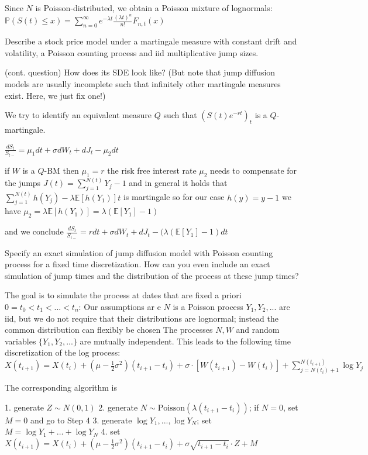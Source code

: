Since \(N\) is Poisson-distributed, we obtain a Poisson mixture of lognormals:
\( \mathbb{P} (S(t) \le x) = \sum_{n=0}^\infty e^{-\lambda t} \frac{(\lambda t)^n}{n!} F_{n,t}(x) \)


Describe a stock price model under a martingale measure with constant drift and
volatility, a Poisson counting process and iid multiplicative jump sizes. 

(cont. question) How does its SDE look like? (But note that jump diffusion models are usually incomplete
such that infinitely other martingale measures exist. Here, we just fix one!)

We try to identify an equivalent measure \( Q \) such that \((S(t)e^{−rt})_t \) is a \( Q \)-martingale.

\( \frac{dS_t}{S_{t-}} = \mu_1 dt + \sigma dW_t + dJ_t - \mu_2 dt \)

if \( W \) is a \( Q \)-BM then
\( \mu_1 = r \) the risk free interest rate
\( \mu_2 \) needs to compensate for the jumps \( J(t) = \sum_{j=1}^{N(t)} Y_j - 1 \)
and in general it holds that \( \sum_{j=1}^{N(t)} h(Y_j) - \lambda \mathbb{E}[h(Y_1)]t  \) is martingale
so for our case \( h(y) = y - 1 \) we have \( \mu_2 = \lambda \mathbb{E}[h(Y_1)] = \lambda(\mathbb{E}[Y_1] - 1) \)

and we conclude 
\( \frac{dS_t}{S_{t-}} = rdt + \sigma dW_t + dJ_t - (\lambda(\mathbb{E}[Y_1] - 1)dt \)


Specify an exact simulation of jump diffusion model with Poisson counting process
for a fixed time discretization. How can you even include an exact simulation of
jump times and the distribution of the process at these jump times?

The goal is to simulate the process at dates that are fixed a priori \( 0 = t_0 < t_1 < ... < t_n \):
Our assumptions ar e
\( N \) is a Poisson process
\(Y_1, Y_2, ...\) are iid, but we do not require that their distributions are lognormal; instead the common distribution can flexibly be chosen
The processes \( N, W \) and random variables \(\{Y_1, Y_2, ...\}\) are mutually independent.
This leads to the following time discretization of the log process:
\(X(t_{i+1}) = X(t_i) + (\mu - \frac{1}{2} \sigma^2) (t_{i+1} - t_i) + \sigma \cdot [W(t_{i+1}) - W(t_i)] + \sum_{j=N(t_i)+1}^{N(t_{i+1})} \log Y_j\)

The corresponding algorithm is

1. generate \(Z \sim N(0,1)\)
2. generate \(N \sim \text{Poisson}(\lambda(t_{i+1}-t_{i}))\);
   if \(N = 0\), set \(M = 0\) and go to Step 4
3. generate \(\log Y_1, ..., \log Y_N\); set \(M = \log Y_1 + \dots + \log Y_N\)
4. set 
\(X(t_{i+1}) = X(t_{i}) + (\mu - \frac{1}{2} \sigma^2) (t_{i+1} - t_i) + \sigma \sqrt{t_{i+1} - t_i} \cdot Z + M\) 

